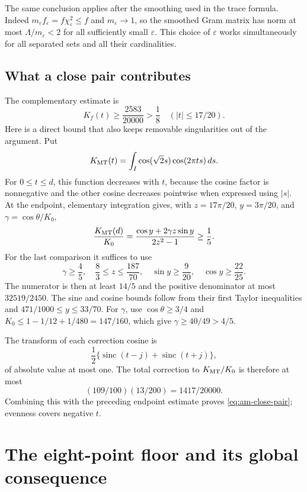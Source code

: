 \documentclass[11pt,reqno]{amsart}
\numberwithin{equation}{section}
\begin{document}
The same conclusion applies after the smoothing used in the trace
formula. Indeed $m_\varepsilon f_\varepsilon=f\chi_\varepsilon^2\le f$
and $m_\varepsilon\to1$, so the smoothed Gram matrix has norm at
most $\Lambda/m_\varepsilon<2$ for all sufficiently small
$\varepsilon$. This choice of $\varepsilon$ works simultaneously for
all separated sets and all their cardinalities.

\subsection{What a close pair contributes}

The complementary estimate is
\begin{equation}
 K_f(t)\ge\frac{2583}{20000}>\frac18
 \quad (|t|\le17/20).
 \label{eq:am-close-pair}
\end{equation}
Here is a direct bound that also keeps removable singularities out of
the argument. Put
\[
 K_{\rm MT}(t)=\int_I\cos(\sqrt2s)\cos(2\pi ts)\,ds.
\]
For $0\le t\le d$, this function decreases with $t$, because the
cosine factor is nonnegative and the other cosine decreases pointwise
when expressed using $|s|$. At the endpoint, elementary integration
gives, with $z=17\pi/20$, $y=3\pi/20$, and
$\gamma=\cos\theta/K_0$,
\[
 \frac{K_{\rm MT}(d)}{K_0}
  =\frac{\cos y+2\gamma z\sin y}{2z^2-1}\ge\frac15.
\]
For the last comparison it suffices to use
\[
 \gamma\ge\frac45,\quad \frac83\le z\le\frac{187}{70},
 \quad\sin y\ge\frac9{20},\quad\cos y\ge\frac{22}{25}.
\]
The numerator is then at least $14/5$ and the positive denominator at
most $32519/2450$. The sine and cosine bounds follow from their first
Taylor inequalities and $471/1000\le y\le33/70$.
For $\gamma$, use $\cos\theta\ge3/4$ and
$K_0\le1-1/12+1/480=147/160$, which give
$\gamma\ge40/49>4/5$.

The transform of each correction cosine is
\[
 \frac12\{\operatorname{sinc}(t-j)+
                  \operatorname{sinc}(t+j)\},
\]
of absolute value at most one. The total correction to
$K_{\rm MT}/K_0$ is therefore at most
\[
 (109/100)(13/200)=1417/20000.
\]
Combining this with the preceding
endpoint estimate proves \eqref{eq:am-close-pair}; evenness covers
negative $t$.

\section{The eight-point floor and its global consequence}
\label{sec:am-transfer}
\end{document}

